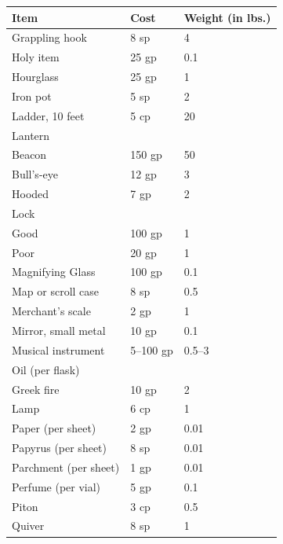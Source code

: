 \begin{multicols}{2}
\begin{minipage}{\columnwidth}
\noindent
\begin{tabular}{|p{}|p{}|p{}|}
\hline
Item	& Cost	& Weight (in lbs.)\\
\hline\hline
\rowcolor[gray]{.9}Grappling hook		& 8 sp	& 4 \\
Holy item 			& 25 gp	& 0.1 \\
\rowcolor[gray]{.9}Hourglass			& 25 gp	& 1 \\
Iron pot			& 5 sp	& 2 \\
\rowcolor[gray]{.9}Ladder, 10 feet		& 5 cp	& 20 \\
Lantern				& 	& \\
\hspace{1em}Beacon			& 150 gp	& 50 \\
\rowcolor[gray]{.9}\hspace{1em}Bull's-eye		& 12 gp	& 3 \\
\hspace{1em}Hooded			& 7 gp	& 2 \\
\rowcolor[gray]{.9}Lock				& 	& \\
\rowcolor[gray]{.9}\hspace{1em}Good				& 100 gp	& 1 \\
\hspace{1em}Poor				& 20 gp	& 1 \\
\rowcolor[gray]{.9}Magnifying Glass	& 100 gp	& 0.1 \\
Map or scroll case 	& 8 sp	& 0.5 \\
\rowcolor[gray]{.9}Merchant's scale	& 2 gp	& 1 \\
Mirror, small metal	& 10 gp	& 0.1 \\
\rowcolor[gray]{.9}Musical instrument	& 5--100 gp	& 0.5--3 \\
Oil (per flask)		& 	& \\
\hspace{1em}Greek fire		& 10 gp	& 2 \\
\rowcolor[gray]{.9}\hspace{1em}Lamp				& 6 cp	& 1 \\
Paper (per sheet)	& 2 gp	& 0.01 \\
\rowcolor[gray]{.9}Papyrus (per sheet)	& 8 sp	& 0.01 \\
Parchment (per sheet)	& 1 gp	& 0.01 \\
\rowcolor[gray]{.9}Perfume (per vial)	& 5 gp	& 0.1 \\
Piton				& 3 cp	& 0.5 \\
\rowcolor[gray]{.9}Quiver				& 8 sp	& 1 \\

\end{tabular}
\end{minipage}
\end{multicols}
